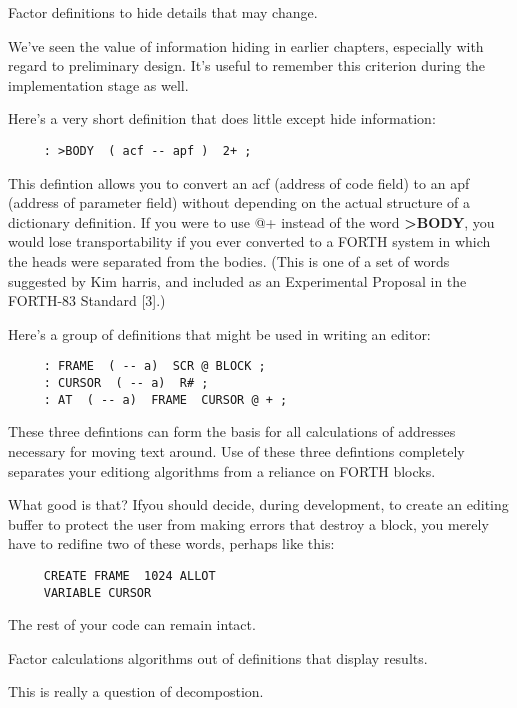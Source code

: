 \begin{tip}
Factor definitions to hide details that may change.
\end{tip}
We've seen the value of information hiding in earlier chapters, especially with regard to preliminary design. It's useful to remember this criterion during the implementation stage as well.

Here's a very short definition that does little except hide information:

\begin{verbatim}
     : >BODY  ( acf -- apf )  2+ ;
\end{verbatim}


\noindent
This defintion allows you to convert an acf (address of code field) to an apf (address of parameter field) without depending on the actual structure of a dictionary definition. If you were to use @+ instead of the word \textbf{>BODY}, you would lose transportability if you ever converted to a FORTH system in which the heads were separated from the bodies. (This is one of a set of words suggested by Kim harris, and included as an Experimental Proposal in the FORTH-83 Standard [3].)

Here's a group of definitions that might be used in writing an editor:

\begin{verbatim}
     : FRAME  ( -- a)  SCR @ BLOCK ;
     : CURSOR  ( -- a)  R# ;
     : AT  ( -- a)  FRAME  CURSOR @ + ;
\end{verbatim}
These three defintions can form the basis for all calculations of addresses necessary for moving text around. Use of these three defintions completely separates your editiong algorithms from a reliance on FORTH blocks.

What good is that? Ifyou should decide, during development, to create an editing buffer to protect the user from making errors that destroy a block, you merely have to redifine two of these words, perhaps like this:

\begin{verbatim}
     CREATE FRAME  1024 ALLOT
     VARIABLE CURSOR
\end{verbatim}
The rest of your code can remain intact. 

\begin{tip}
Factor calculations algorithms out of definitions that display results.
\end{tip}
This is really a question of decompostion.

